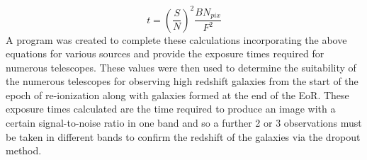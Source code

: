 \documentclass[pdf,color]{UoBnote}
\begin{document}
\newline
\begin{equation}
t = (\frac{S}{N})^2 \frac{BN_{pix}}{F^2}
\end{equation}
\newline  
A program was created to complete these calculations incorporating the above equations for various sources and provide the exposure times required for numerous telescopes. These values were then used to determine the suitability of the numerous telescopes for observing high redshift galaxies from the start of the epoch of re-ionization along with galaxies formed at the end of the EoR. These exposure times calculated are the time required to produce an image with a certain signal-to-noise ratio in one band and so a further 2 or 3 observations must be taken in different bands to confirm the redshift of the galaxies via the dropout method. 
\end{document}

